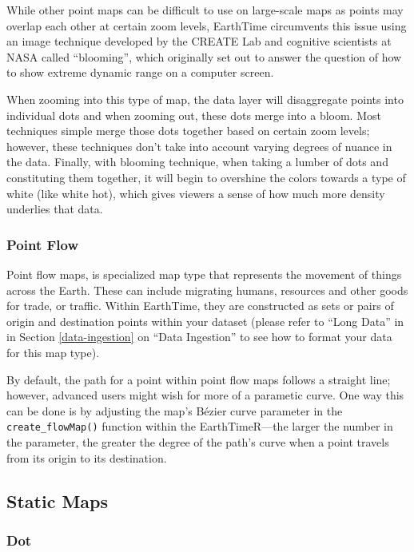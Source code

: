 \documentclass[
]{book}
\begin{document}
While other point maps can be difficult to use on large-scale maps as points may overlap each other at certain zoom levels, EarthTime circumvents this issue using an image technique developed by the CREATE Lab and cognitive scientists at NASA called ``blooming'', which originally set out to answer the question of how to show extreme dynamic range on a computer screen.

When zooming into this type of map, the data layer will disaggregate points into individual dots and when zooming out, these dots merge into a bloom. Most techniques simple merge those dots together based on certain zoom levels; however, these techniques don't take into account varying degrees of nuance in the data. Finally, with blooming technique, when taking a lumber of dots and constituting them together, it will begin to overshine the colors towards a type of white (like white hot), which gives viewers a sense of how much more density underlies that data.

\hypertarget{point-flow}{%
\subsubsection*{Point Flow}\label{point-flow}}


Point flow maps, is specialized map type that represents the movement of things across the Earth. These can include migrating humans, resources and other goods for trade, or traffic. Within EarthTime, they are constructed as sets or pairs of origin and destination points within your dataset (please refer to ``Long Data'' in in Section \ref{data-ingestion} on ``Data Ingestion'' to see how to format your data for this map type).

By default, the path for a point within point flow maps follows a straight line; however, advanced users might wish for more of a parametic curve. One way this can be done is by adjusting the map's Bézier curve parameter in the \texttt{create\_flowMap()} function within the EarthTimeR---the larger the number in the parameter, the greater the degree of the path's curve when a point travels from its origin to its destination.

\hypertarget{static-maps}{%
\subsection*{Static Maps}\label{static-maps}}


\hypertarget{dot}{%
\subsubsection*{Dot}\label{dot}}
\end{document}
